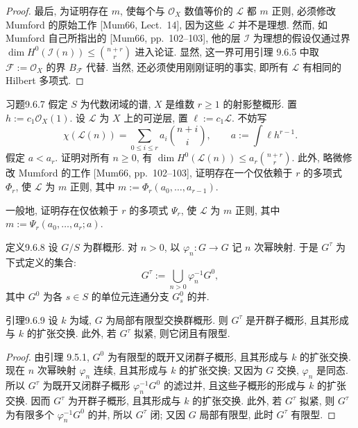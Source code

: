 \begin{proof}
最后, 为证明存在 $m$, 使每个与 $\mathcal O_X$ 数值等价的 $\mathcal L$ 都 $m$ 正则, 必须修改 Mumford 的原始工作 [Mum66, Lect.~14], 因为这些 $\mathcal L$ 并不是理想. 然而, 如 Mumford 自己所指出的 [Mum66, pp.~102--103], 他的层 $\mathcal I$ 为理想的假设仅通过界 $\dim H^0(\mathcal I(n))\leq\binom{n+r}{r}$ 进入论证. 显然, 这一界可用引理 9.6.5 中取 $\mathcal F:=\mathcal O_X$ 的界 $B_{\mathcal F}$ 代替. 当然, 还必须使用刚刚证明的事实, 即所有 $\mathcal L$ 有相同的 Hilbert 多项式.
\end{proof}

\begin{origstatement}{习题}{9.6.7}\label{ch09s6:ex967}
假定 $S$ 为代数闭域的谱, $X$ 是维数 $r\geq1$ 的射影整概形. 置 $h:=c_1\mathcal O_X(1)$. 设 $\mathcal L$ 为 $X$ 上的可逆层, 置 $\ell:=c_1\mathcal L$. 不妨写
\[\chi(\mathcal L(n))=\sum_{0\leq i\leq r}a_i\binom{n+i}{i},\qquad a:=\int\ell h^{r-1}.\]
假定 $a<a_r$. 证明对所有 $n\geq0$, 有 $\dim H^0(\mathcal L(n))\leq a_r\binom{n+r}{r}$. 此外, 略微修改 Mumford 的工作 [Mum66, pp.~102--103], 证明存在一个仅依赖于 $r$ 的多项式 $\Phi_r$, 使 $\mathcal L$ 为 $m$ 正则, 其中 $m:=\Phi_r(a_0,\ldots,a_{r-1})$.

一般地, 证明存在仅依赖于 $r$ 的多项式 $\Psi_r$, 使 $\mathcal L$ 为 $m$ 正则, 其中 $m:=\Psi_r(a_0,\ldots,a_r;a)$.
\end{origstatement}

\begin{origstatement}{定义}{9.6.8}\label{ch09s6:def968}
设 $G/S$ 为群概形. 对 $n>0$, 以 $\varphi_n:G\to G$ 记 $n$ 次幂映射. 于是 $G^\tau$ 为下式定义的集合:
\[G^\tau:=\bigcup_{n>0}\varphi_n^{-1}G^0,\]
其中 $G^0$ 为各 $s\in S$ 的单位元连通分支 $G_s^0$ 的并.
\end{origstatement}

\begin{origstatement}{引理}{9.6.9}\label{ch09s6:lem969}
设 $k$ 为域, $G$ 为局部有限型交换群概形. 则 $G^\tau$ 是开群子概形, 且其形成与 $k$ 的扩张交换. 此外, 若 $G^\tau$ 拟紧, 则它闭且有限型.
\end{origstatement}
\begin{proof}
由引理 9.5.1, $G^0$ 为有限型的既开又闭群子概形, 且其形成与 $k$ 的扩张交换. 现在 $n$ 次幂映射 $\varphi_n$ 连续, 且其形成与 $k$ 的扩张交换; 又因为 $G$ 交换, $\varphi_n$ 是同态. 所以 $G^\tau$ 为既开又闭群子概形 $\varphi_n^{-1}G^0$ 的滤过并, 且这些子概形的形成与 $k$ 的扩张交换. 因而 $G^\tau$ 为开群子概形, 且其形成与 $k$ 的扩张交换. 此外, 若 $G^\tau$ 拟紧, 则 $G^\tau$ 为有限多个 $\varphi_n^{-1}G^0$ 的并, 所以 $G^\tau$ 闭; 又因 $G$ 局部有限型, 此时 $G^\tau$ 有限型.
\end{proof}

